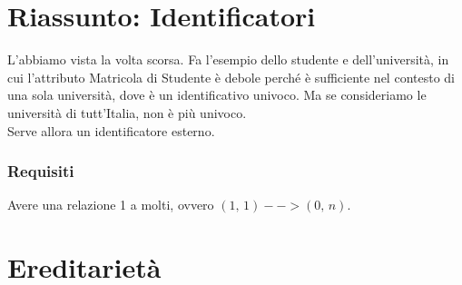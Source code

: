 \section{Riassunto: Identificatori}
L'abbiamo vista la volta scorsa. Fa l'esempio dello studente e dell'università, in cui l'attributo Matricola di Studente è debole perché è sufficiente nel contesto di una sola università, dove è un identificativo univoco. Ma se consideriamo le università di tutt'Italia, non è più univoco.
\\Serve allora un identificatore esterno.
\subsubsection{Requisiti}
Avere una relazione 1 a molti, ovvero $(1,\, 1) --> (0,\, n)$.

\section{Ereditarietà}
